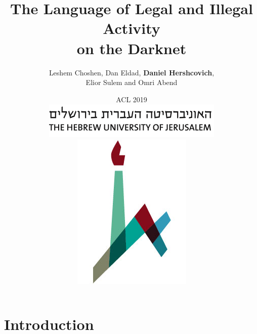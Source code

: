 \documentclass[t,xcolor={svgnames,table}]{beamer}
\begin{document}
\title[]{The Language of Legal and Illegal Activity \\ on the Darknet}
\author[Daniel Hershcovich]{Leshem Choshen, Dan Eldad, \textbf{Daniel Hershcovich}, \\
Elior Sulem and Omri Abend }
\date[]{ACL 2019 \\
	\hspace{0.5cm}
\includegraphics[width=.5\textwidth]{huji_banner.png}
\includegraphics[width=.1\textwidth]{huji_logo.jpg}}

\begin{frame}
\titlepage
\end{frame}

\section*{Introduction}

{%
}
\end{document}

